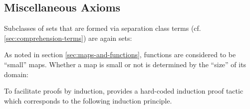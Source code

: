 \documentclass{stex}
\begin{document}
\subsection{Miscellaneous Axioms}\label{sec:misc-axioms}

Subclasses of sets that are formed via separation class terms (cf.
\ref{sec:comprehension-terms}) are again sets:


As noted in section \ref{sec:maps-and-functions}, functions are considered to be
``small'' maps. Whether a map is small or not is determined by the ``size'' of
its domain:


To facilitate proofs by induction, \Naproche provides a hard-coded induction
proof tactic which corresponds to the following induction principle.



\end{document}
